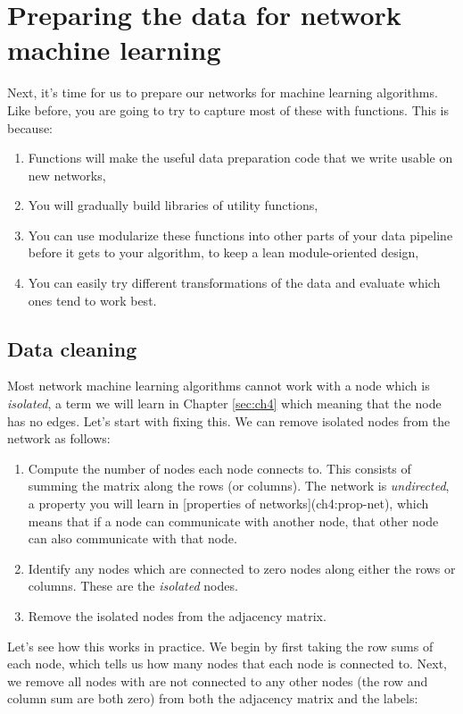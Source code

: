 \section{Preparing the data for network machine learning}
\label{sec:ch2:prepare}
Next, it's time for us to prepare our networks for machine learning algorithms. Like before, you are going to try to capture most of these with functions. This is because:

\begin{enumerate}
    \item Functions will make the useful data preparation code that we write usable on new networks,
    \item You will gradually build libraries of utility functions,
    \item You can use modularize these functions into other parts of your data pipeline before it gets to your algorithm, to keep a lean module-oriented design,
    \item You can easily try different transformations of the data and evaluate which ones tend to work best.
\end{enumerate}

\subsection{Data cleaning}

Most network machine learning algorithms cannot work with a node which is \emph{isolated}, a term we will learn in Chapter \ref{sec:ch4} which meaning that the node has no edges. Let's start with fixing this. We can remove isolated nodes from the network as follows:
\begin{enumerate}
\item Compute the number of nodes each node connects to. This consists of summing the matrix along the rows (or columns). The network is \emph{undirected}, a property you will learn in [properties of networks](ch4:prop-net), which means that if a node can communicate with another node, that other node can also communicate with that node.
\item Identify any nodes which are connected to zero nodes along either the rows or columns. These are the \emph{isolated} nodes.
\item Remove the isolated nodes from the adjacency matrix.
\end{enumerate}

Let's see how this works in practice. We begin by first taking the row sums of each node, which tells us how many nodes that each node is connected to. Next, we remove all nodes with are not connected to any other nodes (the row and column sum are both zero) from both the adjacency matrix and the labels:


